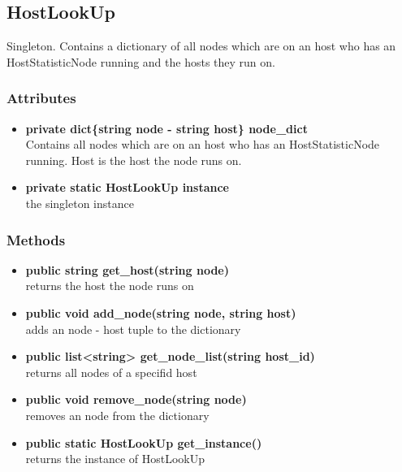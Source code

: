 \subsection{HostLookUp}
Singleton. Contains a dictionary of all nodes which are on an host who has an HostStatisticNode running and the hosts they run on.
\subsubsection{Attributes}
\begin{itemize}
	\item \textbf{ private dict\{string node - string host\} node\_dict }\\
		Contains all nodes which are on an host who has an HostStatisticNode running. Host is the host the node runs on.
	\item \textbf{ private static HostLookUp instance }\\
		the singleton instance
\end{itemize}
\subsubsection{Methods}
\begin{itemize}
	\item \textbf{ public string get\_host(string node) }\\
		returns the host the node runs on
	\item \textbf{ public void add\_node(string node, string host) }\\
		adds an node - host tuple to the dictionary
	\item \textbf{ public list<string> get\_node\_list(string host\_id) }\\
		returns all nodes of a specifid host
	\item \textbf{ public void remove\_node(string node) }\\
		removes an node from the dictionary
	\item \textbf{ public static HostLookUp get\_instance() }\\
		returns the instance of HostLookUp
\end{itemize}
